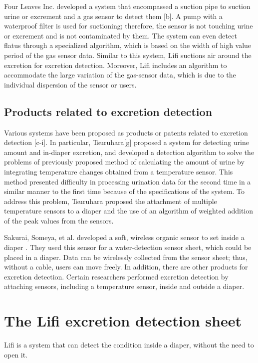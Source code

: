 \documentclass[publish,JRM,paper]{jaciiiarticle}
\begin{document}
Four Leaves Inc. developed a system that encompassed a suction pipe to suction urine or excrement and a gas sensor to detect them [b]. A pump with a waterproof filter is used for suctioning; therefore, the sensor is not touching urine or excrement and is not contaminated by them. The system can even detect flatus through a specialized algorithm, which is based on the width of high value period of the gas sensor data. Similar to this system, Lifi suctions air around the excretion for excretion detection. Moreover, Lifi includes an algorithm to accommodate the large variation of the gas-sensor data, which is due to the individual dispersion of the sensor or users.

\subsection{Products related to excretion detection}
Various systems have been proposed as products or patents related to excretion detection \cite{tamura,ziai}[c-i]. In particular, Tsuruhara[g] proposed a system for detecting urine amount and in-diaper excretion, and developed a detection algorithm to solve the problems of previously proposed method of calculating the amount of urine by integrating temperature changes obtained from a temperature sensor. This method presented difficulty in processing urination data for the second time in a similar manner to the first time because of the specifications of the system. To address this problem, Tsuruhara proposed the attachment of multiple temperature sensors to a diaper and the use of an algorithm of weighted addition of the peak values from the sensors.

Sakurai, Someya, et al. developed a soft, wireless organic sensor to set inside a diaper \cite{fuketa}. They used this sensor for a water-detection sensor sheet, which could be placed in a diaper. Data can be wirelessly collected from the sensor sheet; thus, without a cable, users can move freely.
In addition, there are other products for excretion detection. Certain researchers performed excretion detection by attaching sensors, including a temperature sensor, inside and outside a diaper.
\section{The Lifi excretion detection sheet}
Lifi is a system that can detect the condition inside a diaper, without the need to open it.
\end{document}
